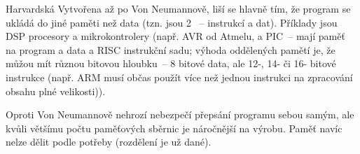 \begin{obecne}{Harvardská}
Vytvořena až po Von Neumannově, liší se hlavně tím, že program se ukládá do jiné paměti než data (tzn. jsou 2 ~-- instrukcí a dat). Příklady jsou DSP procesory a mikrokontrolery (např. AVR od Atmelu, a PIC~-- mají paměť na program a data a RISC instrukční sadu; výhoda oddělených pamětí je, že můžou mít různou bitovou hloubku~-- 8 bitové data, ale 12-, 14- či 16- bitové instrukce (např. ARM musí občas použít více než jednou instrukci na zpracování obsahu plné velikosti)).

Oproti Von Neumannově nehrozí nebezpečí přepsání programu sebou samým, ale kvůli většímu počtu paměťových sběrnic je náročnější na výrobu. Paměť navíc nelze dělit podle potřeby (rozdělení je už dané).
\end{obecne}
